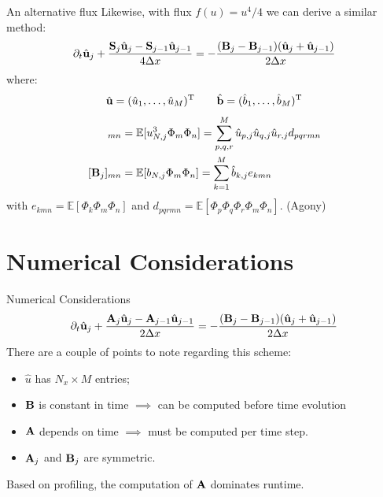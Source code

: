 \documentclass[
    pdf,
    11pt,
    xcolor={svgnames},
  ]{beamer}
\begin{document}
\begin{frame}{An alternative flux}
    Likewise, with flux $f(u) = u^4 / 4$ we can derive a similar method:
   \begin{equation}
       \partial_t \hat{\vb{u}}_j + \frac{\vb{S}_j \hat{\vb{u}}_j - \vb{S}_{j-1} \hat{\vb{u}}_{j-1}}{4\Delta x} = -\frac{(\vb{B}_j - \vb{B}_{j-1})(\hat{\vb{u}}_j + \hat{\vb{u}}_{j-1})}{2\Delta x}
   \end{equation} 
   where:
   \begin{equation*}
       \hat{\vb{u}} = (\hat{u}_1, \dots, \hat{u}_M)^\mathrm{T}
       \qquad
       \hat{\vb{b}} = (\hat{b}_1, \dots, \hat{b}_M)^\mathrm{T}
   \end{equation*}
   \begin{align*}
       [\vb{S}_j]_{mn} &= \mathbb{E}[u_{N,j}^3 \Phi_m \Phi_n]  = \sum_{p,q,r}^M \hat{u}_{p,j} \hat{u}_{q,j} \hat{u}_{r,j} d_{pqrmn}\\
       [\vb{B}_j]_{mn} &= \mathbb{E}[b_{N,j} \Phi_m \Phi_n] = \sum_{k=1}^M \hat{b}_{k,j} e_{kmn}
   \end{align*}
   with $e_{kmn} = \mathbb{E}[\Phi_k \Phi_m \Phi_n]$ and $d_{pqrmn} = \mathbb{E}[\Phi_p \Phi_q \Phi_r \Phi_m \Phi_n]$. (Agony)
\end{frame}

\section{Numerical Considerations}
\begin{frame}{Numerical Considerations}
   \begin{equation*}
       \partial_t \hat{\vb{u}}_j + \frac{\vb{A}_j \hat{\vb{u}}_j - \vb{A}_{j-1} \hat{\vb{u}}_{j-1}}{2\Delta x} = -\frac{(\vb{B}_j - \vb{B}_{j-1})(\hat{\vb{u}}_j + \hat{\vb{u}}_{j-1})}{2\Delta x}
   \end{equation*} 
   There are a couple of points to note regarding this scheme:
   \begin{itemize}[<+->]
       \item $\hat{u}$ has $N_x \times M$ entries;
       \item $\vb{B}$ is constant in time $\implies$ can be computed before time evolution
       \item $\vb{A}$ depends on time $\implies$ must be computed per time step.
       \item $\vb{A}_j$ and $\vb{B}_j$ are symmetric.
   \end{itemize}
   Based on profiling, the computation of $\vb{A}$ dominates runtime.
\end{frame}
\end{document}
